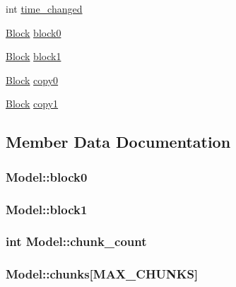 \begin{DoxyCompactItemize}
\item 
int \hyperlink{structModel_aa4050c23342bfe2f344466b2e99dd3cb}{time\+\_\+changed}
\item 
\hyperlink{structBlock}{Block} \hyperlink{structModel_afddf699a972eb1144e4e2b6165e6c825}{block0}
\item 
\hyperlink{structBlock}{Block} \hyperlink{structModel_a375b22a0a3043bc685947b33d83bcc17}{block1}
\item 
\hyperlink{structBlock}{Block} \hyperlink{structModel_a3ddb16326999cefcf195fdd796d411a4}{copy0}
\item 
\hyperlink{structBlock}{Block} \hyperlink{structModel_a80358faa79d27e0e905f6542044458c5}{copy1}
\end{DoxyCompactItemize}


\subsection{Member Data Documentation}
\subsubsection[{\texorpdfstring{block0}{block0}}]{ Model\+::block0}\hypertarget{structModel_afddf699a972eb1144e4e2b6165e6c825}{}\label{structModel_afddf699a972eb1144e4e2b6165e6c825}
\subsubsection[{\texorpdfstring{block1}{block1}}]{ Model\+::block1}\hypertarget{structModel_a375b22a0a3043bc685947b33d83bcc17}{}\label{structModel_a375b22a0a3043bc685947b33d83bcc17}
\subsubsection[{\texorpdfstring{chunk\+\_\+count}{chunk_count}}]{\setlength{\rightskip}{0pt plus 5cm}int Model\+::chunk\+\_\+count}\hypertarget{structModel_ac890daa53d9fca686f850c61707534d3}{}\label{structModel_ac890daa53d9fca686f850c61707534d3}
\subsubsection[{\texorpdfstring{chunks}{chunks}}]{ Model\+::chunks\mbox{[}{\bf M\+A\+X\+\_\+\+C\+H\+U\+N\+KS}\mbox{]}}\hypertarget{structModel_a454955bd2cbb283c269a5189d29b6362}{}\label{structModel_a454955bd2cbb283c269a5189d29b6362}
